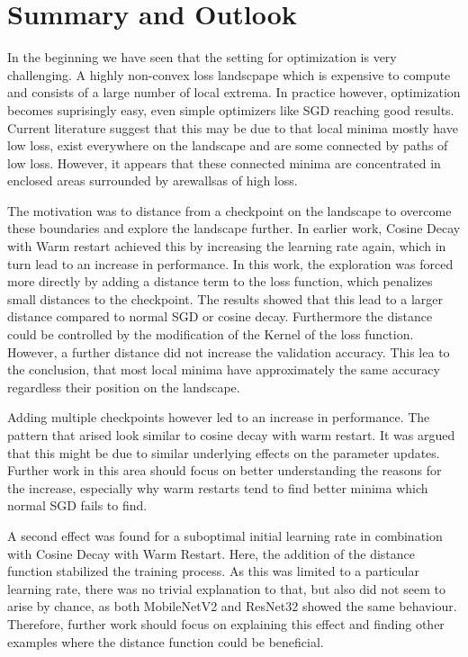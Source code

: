 \chapter{Summary and Outlook}

In the beginning we have seen that the setting for optimization is very
challenging. A highly non-convex loss landscpape which is expensive to compute
and consists of a large number of local extrema. In practice however,
optimization becomes suprisingly easy, even simple optimizers like SGD reaching
good results. Current literature suggest that this may be due to that local
minima mostly have low loss, exist everywhere on the landscape and are some
connected by paths of low loss. However, it appears that these connected minima are
concentrated in enclosed areas surrounded by arewallsas of high loss.

The motivation was to distance from a checkpoint on the landscape to overcome
these boundaries and explore the landscape further. In earlier work, Cosine
Decay with Warm restart achieved this by increasing the learning rate again,
which in turn lead to an increase in performance. In this work, the exploration
was forced more directly by adding a distance term to the loss function, which
penalizes small distances to the checkpoint. The results showed that this lead
to a larger distance compared to normal SGD or cosine decay. Furthermore the
distance could be controlled by the modification of the Kernel of the loss
function. However, a further distance did not increase the validation accuracy.
This lea to the conclusion, that most local minima have approximately the same
accuracy regardless their position on the landscape.

Adding multiple checkpoints however led to an increase in performance. The
pattern that arised look similar to cosine decay with warm restart. It was
argued that this might be due to similar underlying effects on the parameter
updates. Further work in this area should focus on better understanding the
reasons for the increase, especially why warm restarts tend to find better
minima which normal SGD fails to find.

A second effect was found for a suboptimal initial learning rate in combination
with Cosine Decay with Warm Restart. Here, the addition of the distance function
stabilized the training process. As this was limited to a particular learning
rate, there was no trivial explanation to that, but also did not seem to arise
by chance, as both MobileNetV2 and ResNet32 showed the same behaviour.
Therefore, further work should focus on explaining this effect and finding other
examples where the distance function could be beneficial.

